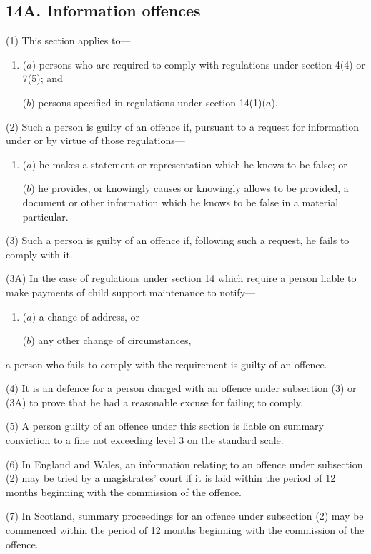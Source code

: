 \documentclass[12pt,a4paper]{article}
\begin{document}
\subsection{14A. Information offences}

(1) This section applies to---
\begin{enumerate}\item[]
($a$)
persons who are required to comply with regulations under section 4(4) or
7(5); and

($b$)
persons specified in regulations under section 14(1)($a$).
\end{enumerate}

(2)
Such a person is guilty of an offence if, pursuant to a request for information
under or by virtue of those regulations---
\begin{enumerate}\item[]
($a$)
he makes a statement or representation which he knows to be false; or

($b$)
he provides, or knowingly causes or knowingly allows to be provided, a
document or other information which he knows to be false in a material
particular.
\end{enumerate}

(3)
Such a person is guilty of an offence if, following such a request, he fails to
comply with it.

(3A) In
the case of regulations under section 14 which require a person liable to
make payments of child support maintenance to notify---
\begin{enumerate}\item[]
($a$) a change of address, or

($b$)
any other change of circumstances,
\end{enumerate}
a person who fails to comply with the requirement is guilty of an offence.

(4)
It is an defence for a person charged with an offence under subsection (3) or
(3A) to prove that he had a reasonable excuse for failing to comply.

(5)
A person guilty of an offence under this section is liable on summary conviction
to a fine not exceeding level 3 on the standard scale.

(6) In England and Wales, an information relating to an offence under subsection
(2)
may be tried by a magistrates’ court if it is laid within the period of 12 months
beginning with the commission of the offence.

(7)
In Scotland, summary proceedings for an offence under subsection (2) may be
commenced within the period of 12 months beginning with the commission of the
offence.
\end{document}
